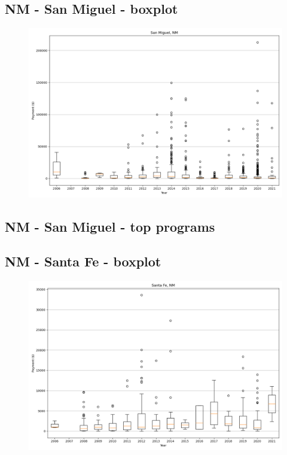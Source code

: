 \subsection*{NM - San Miguel - boxplot}
\begin{figure}[h]
\centering
\includegraphics[width=7in]{../output/boxplots/counties/San Miguel-NM_boxplot.png}
\end{figure}


\subsection*{NM - San Miguel - top programs}

\newpage
\subsection*{NM - Santa Fe - boxplot}
\begin{figure}[h]
\centering
\includegraphics[width=7in]{../output/boxplots/counties/Santa Fe-NM_boxplot.png}
\end{figure}


